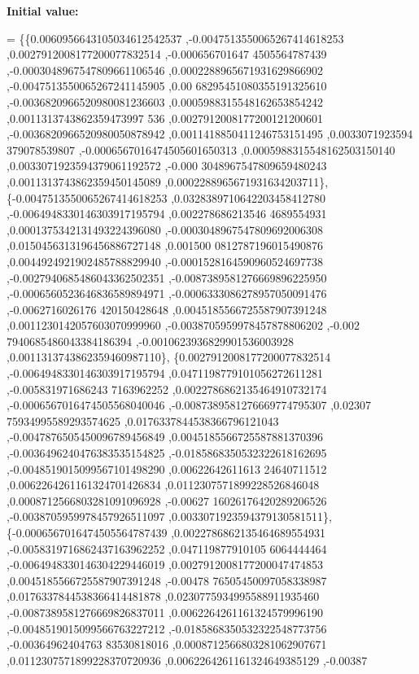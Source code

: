 {\bfseries Initial value\+:}
\begin{DoxyCode}
= \{\{0.0060956643105034612542537 ,-0.0047513550065267414618253 ,0.0027912008177200077832514 ,-0.000656701647
      4505564787439 ,-0.0003048967547809661106546 ,0.0002288965671931629866902 ,-0.0047513550065267241145905 ,0.00
      68295451080355191325610 ,-0.0036820966520980081236603 ,0.0005988315548162653854242 ,0.0011313743862359473997
      536 ,0.0027912008177200121200601 ,-0.0036820966520980050878942 ,0.0011418850411246753151495 ,0.0033071923594
      379078539807 ,-0.0006567016474505601650313 ,0.0005988315548162503150140 ,0.0033071923594379061192572 ,-0.000
      3048967547809659480243 ,0.0011313743862359450145089 ,0.0002288965671931634203711\},
\{-0.0047513550065267414618253 ,0.0328389710642203458412780 ,-0.0064948330146303917195794 ,0.002278686213546
      4689554931 ,0.0001375342131493224396080 ,-0.0003048967547809692006308 ,0.0150456313196456886727148 ,0.001500
      0812787196015490876 ,0.0044924921902485788829940 ,-0.0001528164590960524697738 ,-0.0027940685486043362502351
       ,-0.0087389581276669896225950 ,-0.0006560523646836589894971 ,-0.0006333086278957050091476 ,-0.0062716026176
      420150428648 ,0.0045185566725587907391248 ,0.0011230142057603070999960 ,-0.0038705959978457878806202 ,-0.002
      7940685486043384186394 ,-0.0010623936829901536003928 ,0.0011313743862359460987110\},
\{0.0027912008177200077832514 ,-0.0064948330146303917195794 ,0.0471198779101056272611281 ,-0.005831971686243
      7163962252 ,0.0022786862135464910732174 ,-0.0006567016474505568040046 ,-0.0087389581276669774795307 ,0.02307
      75934995589293574625 ,0.0176337844538366796121043 ,-0.0047876505450096789456849 ,0.0045185566725587881370396
       ,-0.0036496240476383535154825 ,-0.0185868350532322618162695 ,-0.0048519015099567101498290 ,0.00622642611613
      24640711512 ,0.0062264261161324701426834 ,0.0112307571899228526846048 ,0.0008712566803281091096928 ,-0.00627
      16026176420289206526 ,-0.0038705959978457926511097 ,0.0033071923594379130581511\},
\{-0.0006567016474505564787439 ,0.0022786862135464689554931 ,-0.0058319716862437163962252 ,0.047119877910105
      6064444464 ,-0.0064948330146304229446019 ,0.0027912008177200047474853 ,0.0045185566725587907391248 ,-0.00478
      76505450097058338987 ,0.0176337844538366414481878 ,0.0230775934995588911935460 ,-0.0087389581276669826837011
       ,0.0062264261161324579996190 ,-0.0048519015099566763227212 ,-0.0185868350532322548773756 ,-0.00364962404763
      83530818016 ,0.0008712566803281062907671 ,0.0112307571899228370720936 ,0.0062264261161324649385129 ,-0.00387

\end{DoxyCode}
